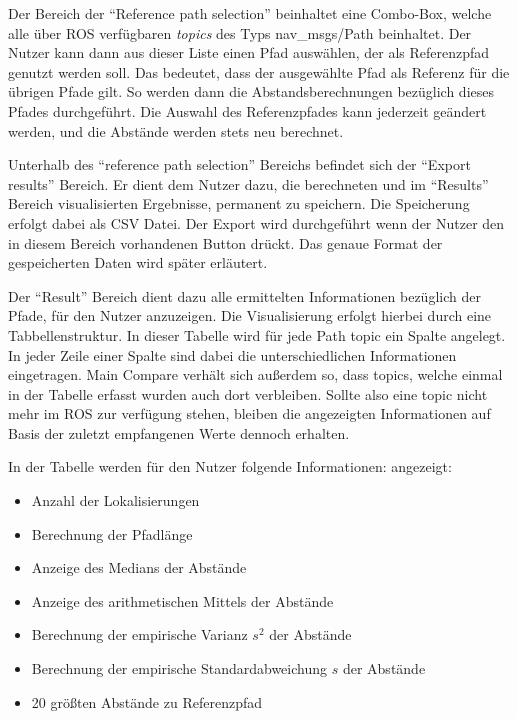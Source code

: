 
Der Bereich der ``Reference path selection'' beinhaltet eine Combo-Box, welche
alle über ROS verfügbaren \textit{topics} des Typs nav\_msgs/Path beinhaltet.
Der Nutzer kann dann aus dieser Liste einen Pfad auswählen, der als
Referenzpfad genutzt werden soll. Das bedeutet, dass der ausgewählte Pfad als
Referenz für die übrigen Pfade gilt. So werden dann die Abstandsberechnungen
bezüglich dieses Pfades durchgeführt. Die Auswahl des Referenzpfades kann
jederzeit geändert werden, und die Abstände werden stets neu berechnet.

Unterhalb des ``reference path selection'' Bereichs befindet sich der ``Export
results'' Bereich. Er dient dem Nutzer dazu, die berechneten und
im ``Results'' Bereich visualisierten Ergebnisse, permanent zu speichern.
Die Speicherung erfolgt dabei als \gls{CSV} Datei. Der Export wird durchgeführt
wenn der Nutzer den in diesem Bereich vorhandenen Button drückt. 
Das genaue Format der gespeicherten Daten wird später erläutert.

Der ``Result'' Bereich dient dazu alle ermittelten Informationen bezüglich der
Pfade, für den Nutzer anzuzeigen. Die Visualisierung erfolgt hierbei durch eine
Tabbellenstruktur. In dieser Tabelle wird für jede Path topic ein Spalte
angelegt.
In jeder Zeile einer Spalte sind dabei die unterschiedlichen
Informationen eingetragen.
Main Compare verhält sich außerdem so, dass topics, welche einmal in
der Tabelle erfasst wurden auch dort verbleiben. Sollte also eine topic nicht
mehr im ROS zur verfügung stehen, bleiben die angezeigten Informationen auf
Basis der zuletzt empfangenen Werte dennoch erhalten. 

In der Tabelle werden für den Nutzer folgende Informationen:
angezeigt:

\begin{itemize}
  \item Anzahl der Lokalisierungen
  \item Berechnung der Pfadlänge
  \item Anzeige des Medians der Abstände
  \item Anzeige des arithmetischen Mittels der Abstände
  \item Berechnung der empirische Varianz $s^2$ der Abstände
  \item Berechnung der empirische Standardabweichung $s$ der Abstände
  \item 20 größten Abstände zu Referenzpfad
\end{itemize}

